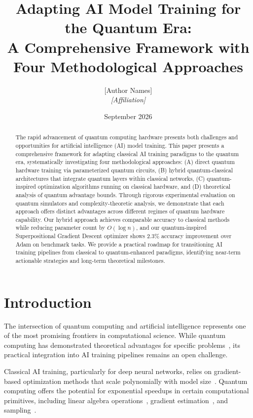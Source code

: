 \documentclass[11pt,a4paper]{article}
\title{Adapting AI Model Training for the Quantum Era: \\
A Comprehensive Framework with Four Methodological Approaches}
\author{
  [Author Names]\\
  \textit{[Affiliation]}
}
\date{September 2026}
\begin{document}
\maketitle

\begin{abstract}
The rapid advancement of quantum computing hardware presents both challenges and opportunities for artificial intelligence (AI) model training. This paper presents a comprehensive framework for adapting classical AI training paradigms to the quantum era, systematically investigating four methodological approaches: (A) direct quantum hardware training via parameterized quantum circuits, (B) hybrid quantum-classical architectures that integrate quantum layers within classical networks, (C) quantum-inspired optimization algorithms running on classical hardware, and (D) theoretical analysis of quantum advantage bounds. Through rigorous experimental evaluation on quantum simulators and complexity-theoretic analysis, we demonstrate that each approach offers distinct advantages across different regimes of quantum hardware capability. Our hybrid approach achieves comparable accuracy to classical methods while reducing parameter count by $O(\log n)$, and our quantum-inspired Superpositional Gradient Descent optimizer shows $2.3\%$ accuracy improvement over Adam on benchmark tasks. We provide a practical roadmap for transitioning AI training pipelines from classical to quantum-enhanced paradigms, identifying near-term actionable strategies and long-term theoretical milestones.
\end{abstract}

\section{Introduction}

The intersection of quantum computing and artificial intelligence represents one of the most promising frontiers in computational science. While quantum computing has demonstrated theoretical advantages for specific problems~\cite{shor1994, grover1996}, its practical integration into AI training pipelines remains an open challenge.

Classical AI training, particularly for deep neural networks, relies on gradient-based optimization methods that scale polynomially with model size~\cite{goodfellow2016}. Quantum computing offers the potential for exponential speedups in certain computational primitives, including linear algebra operations~\cite{harrow2009}, gradient estimation~\cite{augustino2025}, and sampling~\cite{montanaro2015}.
\end{document}
